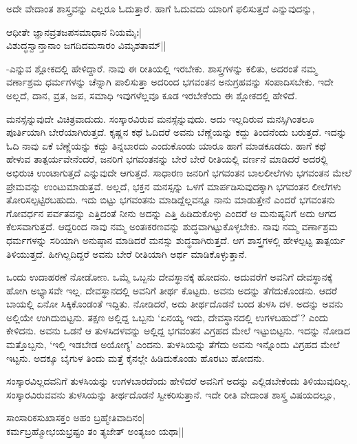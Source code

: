 ಅದೇ ವೇದಾಂತ ಶಾಸ್ತ್ರವನ್ನು ಎಲ್ಲರೂ ಓದುತ್ತಾರೆ. ಹಾಗೆ ಓದುವದು ಯಾರಿಗೆ ಫಲಿಸುತ್ತದೆ ಎನ್ನುವುದನ್ನು,

\begin{shloka}
ಆಧೀತೇ ಜ್ಞಾನವ್ರತಜಪಸಮಾಧಾನ ನಿಯಮೈಃ|\\
ವಿಶುದ್ಧಸ್ವಾನ್ತಾನಾಂ ಜಗದಿದಮಸಾರಂ ವಿಮೃಶತಾಮ್||
\end{shloka}

-ಎನ್ನುವ ಶ್ಲೋಕದಲ್ಲಿ ಹೇಳಿದ್ದಾರೆ. ನಾವು ಈ ರೀತಿಯಲ್ಲಿ ಇರಬೇಕು. ಶಾಸ್ತ್ರಗಳನ್ನು ಕಲಿತು, ಅದರಂತೆ ನಮ್ಮ ವರ್ಣಾಶ್ರಮ ಧರ್ಮಗಳನ್ನು ಚೆನ್ನಾಗಿ ಪಾಲಿಸುತ್ತಾ ಅದರಿಂದ ಭಗವಂತನ ಅನುಗ್ರಹವನ್ನು ಸಂಪಾದಿಸಬೇಕು. ಇದೇ ಅಲ್ಲದೆ, ದಾನ, ವ್ರತ, ಜಪ, ಸಮಾಧಿ ಇವುಗಳೆಲ್ಲವೂ ಕೂಡ ಇರಬೇಕೆಂದು ಈ ಶ್ಲೋಕದಲ್ಲಿ ಹೇಳಿದೆ.

ಮನಸ್ಸೆನ್ನುವುದೇ ವಿಚಿತ್ರವಾದುದು. ಸಂಸ್ಕಾರವಿರುವ ಮನಸ್ಸೆನ್ನುವುದು. ಅದು ಇಲ್ಲದಿರುವ ಮನಸ್ಸಿಗಿಂತಲೂ ಪೂರ್ತಿಯಾಗಿ ಬೇರೆಯಾಗಿರುತ್ತದೆ. ಕೃಷ್ಣನ ಕಥೆ ಓದಿದರೆ ಅವನು ಬೆಣ್ಣೆಯನ್ನು ಕದ್ದು ತಿಂದನೆಂದು ಬರುತ್ತದೆ. ಇದನ್ನು ಓದಿ ನಾವು ಏಕೆ ಬೆಣ್ಣೆಯನ್ನು ಕದ್ದು ತಿನ್ನಬಾರದು ಎಂದುಕೊಂಡು ಯಾರೂ ಹಾಗೆ ಮಾಡಕೂಡದು. ಹಾಗೆ ಕಥೆ ಹೇಳುವ ತಾತ್ಪರ್ಯವೇನೆಂದರೆ, ಜನರಿಗೆ ಭಗವಂತನನ್ನು ಬೇರೆ ಬೇರೆ ರೀತಿಯಲ್ಲಿ ವರ್ಣನೆ ಮಾಡಿದರೆ ಅದರಲ್ಲಿ ಅಭಿರುಚಿ ಉಂಟಾಗುತ್ತದೆ ಎನ್ನುವುದೇ ಆಗುತ್ತದೆ. ಸಾಧಾರಣ ಜನರಿಗೆ ಭಗವಂತನ ಬಾಲಲೀಲೆಗಳು ಭಗವಂತನ ಮೇಲೆ ಪ್ರೇಮವನ್ನು ಉಂಟುಮಾಡುತ್ತವೆ. ಅಲ್ಲದೆ, ಭಕ್ತನ ಮನಸ್ಸನ್ನು ಒಳಗೆ ಮಾರ್ಪಡಿಸುವುದಕ್ಕಾಗಿ ಭಗವಂತನ ಲೀಲೆಗಳು ತೋರಿಸಲ್ಪಟ್ಟಿರಬಹುದು. ಇದು ಬಿಟ್ಟು ಭಗವಂತನು ಮಾಡಿದ್ದೆಲ್ಲವನ್ನೂ ನಾನು ಮಾಡುತ್ತೇನೆ ಎಂದರೆ ಭಗವಂತನು ಗೋವರ್ಧನ ಪರ್ವತವನ್ನು ಎತ್ತಿದಂತೆ ನೀನು ಅದನ್ನು ಎತ್ತಿ ಹಿಡಿದುಕೊಳ್ಳು ಎಂದರೆ ಆ ಮನುಷ್ಯನಿಗೆ ಅದು ಆಗದ ಕೆಲಸವಾಗುತ್ತದೆ. ಆದ್ದರಿಂದ ನಾವು ನಮ್ಮ ಅಂತಃಕರಣವನ್ನು ಶುದ್ಧವಾಗಿಟ್ಟುಕೊಳ್ಳಬೇಕು. ನಾವು ನಮ್ಮ ವರ್ಣಾಶ್ರಮ ಧರ್ಮಗಳನ್ನು ಸರಿಯಾಗಿ ಅನುಷ್ಠಾನ ಮಾಡಿದರೆ ಮನಸ್ಸು ಶುದ್ಧವಾಗಿರುತ್ತದೆ. ಆಗ ಶಾಸ್ತ್ರಗಳಲ್ಲಿ ಹೇಳಲ್ಪಟ್ಟ ತಾತ್ಪರ್ಯ ತಿಳಿಯುತ್ತದೆ. ಹೀಗಿಲ್ಲದಿದ್ದರೆ ಅವನು ಬೇರೆ ರೀತಿಯಾಗಿ ಅರ್ಥ ಮಾಡಿಕೊಳ್ಳುತ್ತಾನೆ.

ಒಂದು ಉದಾಹರಣೆ ನೋಡೋಣ. ಒಮ್ಮೆ ಒಬ್ಬನು ದೇವಸ್ಥಾನಕ್ಕೆ ಹೋದನು. ಅದುವರೆಗೆ ಅವನಿಗೆ ದೇವಸ್ಥಾನಕ್ಕೆ ಹೋಗಿ ಅಭ್ಯಾಸವೇ ಇಲ್ಲ. ದೇವಸ್ಥಾನದಲ್ಲಿ ಅವನಿಗೆ ತೀರ್ಥ ಕೊಟ್ಟರು. ಅವನು ಅದನ್ನು ತೆಗೆದುಕೊಂಡನು. ಆದರೆ ಬಾಯಲ್ಲಿ ಏನೋ ಸಿಕ್ಕಿಕೊಂಡಂತೆ ಇದ್ದಿತು. ನೋಡಿದರೆ, ಅದು ತೀರ್ಥದೊಡನೆ ಬಂದ ತುಳಸಿ ದಳ. ಅದನ್ನು ಅವನು ಅಲ್ಲಿಯೇ ಉಗಿದುಬಿಟ್ಟನು. ತಕ್ಷಣ ಅಲ್ಲಿದ್ದ ಒಬ್ಬನು `ಏನಯ್ಯ ಇದು, ದೇವಸ್ಥಾನದಲ್ಲಿ ಉಗಳಬಹುದೆ'? ಎಂದು ಕೇಳಿದನು. ಅವನು ಒಡನೆ ಆ ತುಳಸಿದಳವನ್ನು ಅಲ್ಲಿದ್ದ ಭಗವಂತನ ವಿಗ್ರಹದ ಮೇಲೆ ಇಟ್ಟುಬಿಟ್ಟನು. ಇದನ್ನು ನೋಡಿದ ಮತ್ತೊಬ್ಬನು, `ಇಲ್ಲಿ ಇಡಬೇಡ ಅಯೋಗ್ಯ' ಎಂದನು. ತುಳಸಿಯನ್ನು ತೆಗೆದು ಅವನು ಇನ್ನೊಂದು ವಿಗ್ರಹದ ಮೇಲೆ ಇಟ್ಟನು. ಅದಕ್ಕೂ ಬೈಗುಳ ತಿಂದು ಮತ್ತೆ ಕೈನಲ್ಲೇ ಹಿಡಿದುಕೊಂಡು ಹೊರಟು ಹೋದನು.

ಸಂಸ್ಕಾರವಿಲ್ಲದವನಿಗೆ ತುಳಸಿಯನ್ನು ಉಗಳಬಾರದೆಂದು ಹೇಳಿದರೆ ಅವನಿಗೆ ಅದನ್ನು ಎಲ್ಲಿಡಬೇಕೆಂದು ತಿಳಿಯುವುದಿಲ್ಲ. ಸಂಸ್ಕಾರವಿರುವವನು ತುಳಸಿಯನ್ನು ತೀರ್ಥದೊಡನೆ ಸ್ವೀಕರಿಸುತ್ತಾನೆ. ಇದೇ ರೀತಿ ವೇದಾಂತ ಶಾಸ್ತ್ರ ವಿಷಯದಲ್ಲೂ,

\begin{shloka}
ಸಾಂಸಾರಿಕಸುಖಾಸಕ್ತಂ ಅಹಂ ಬ್ರಹ್ಮೇತಿವಾದಿನಂ|\\
ಕರ್ಮಬ್ರಹ್ಮೋಭಯಭ್ರಷ್ಟಂ ತಂ ತ್ಯಜೇತ್ ಅಂತ್ಯಜಂ ಯಥಾ||
\end{shloka}

